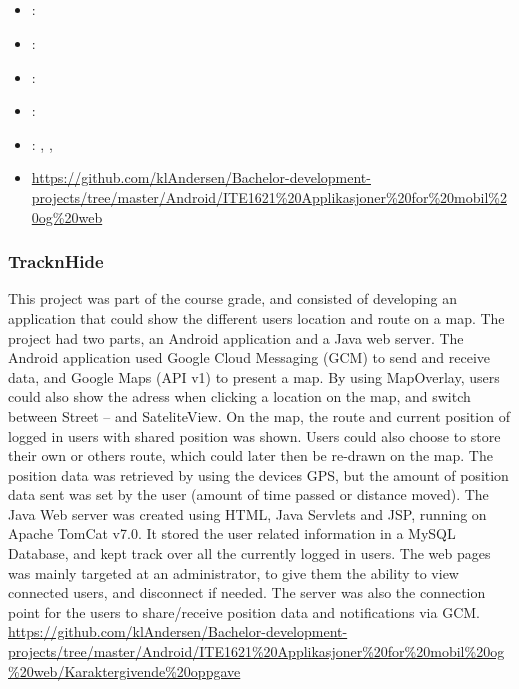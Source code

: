 \subsection[Android course]{}
\label{sec:android_course}
\begin{itemize} 
	\item {}: 
	\item {}: 
	\item {}: 
	\item {}: 
	\item {}: , , 
	\item {} \url{https://github.com/klAndersen/Bachelor-development-projects/tree/master/Android/ITE1621%20Applikasjoner%20for%20mobil%20og%20web}
\end{itemize} 

\subsubsection{TracknHide}
\label{sec:tracknhide}
This project was part of the course grade, and consisted of developing an application that could
show the different users location and route on a map. The project had two parts, an Android
application and a Java web server.
\vspace{0.5em}\newline
The Android application used Google Cloud Messaging (GCM) to send and receive data, and
Google Maps (API v1) to present a map. By using MapOverlay, users could also show the adress
when clicking a location on the map, and switch between Street – and SateliteView. On the map,
the route and current position of logged in users with shared position was shown. Users could also
choose to store their own or others route, which could later then be re-drawn on the map. The
position data was retrieved by using the devices GPS, but the amount of position data sent was set
by the user (amount of time passed or distance moved).
\vspace{0.5em}\newline
The Java Web server was created using HTML, Java Servlets and JSP, running on Apache
TomCat v7.0. It stored the user related information in a MySQL Database, and kept track over all
the currently logged in users. The web pages was mainly targeted at an administrator, to give them
the ability to view connected users, and disconnect if needed. The server was also the connection
point for the users to share/receive position data and notifications via GCM.
 \url{https://github.com/klAndersen/Bachelor-development-projects/tree/master/Android/ITE1621%20Applikasjoner%20for%20mobil%20og%20web/Karaktergivende%20oppgave} 


